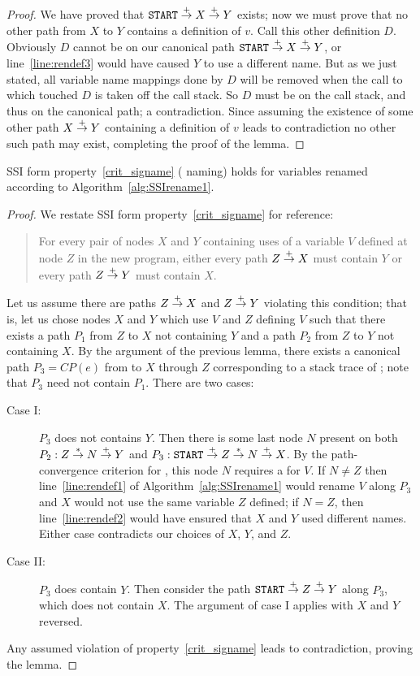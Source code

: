 \begin{proof}
We have proved that $\texttt{START}\stackrel{+}{\rightarrow} X\stackrel{+}{\rightarrow} Y$ exists; now
we must prove that no other path from $X$ to $Y$ contains a definition
of $v$.  Call this other definition $D$.  Obviously $D$ cannot be on
our canonical path $\texttt{START}\stackrel{+}{\rightarrow} X\stackrel{+}{\rightarrow} Y$, or
line~\ref{line:rendef3} would have caused $Y$ to use a different name.
But as we just stated, all variable name mappings done by $D$ will be
removed when the call to  which touched $D$ is taken off
the call stack.  So $D$ must be on the call stack, and thus on the
canonical path; a contradiction. %
%
Since assuming the existence of some other path $X\stackrel{+}{\rightarrow} Y$
containing a definition of $v$ leads to contradiction no other such
path may exist, completing the proof of the lemma.
\end{proof}

\begin{lemma}\label{lem:renamesig}
SSI form property~\ref{crit_signame} (\sigfunction{} naming) holds for
variables renamed according to Algorithm~\ref{alg:SSIrename1}.
\end{lemma}
\begin{proof}
We restate SSI form property~\ref{crit_signame} for reference:
\begin{quote}
For every pair of nodes $X$ and $Y$ containing uses of a
variable $V$ defined at node $Z$ in the new program, either every path
$Z \stackrel{+}{\rightarrow} X$ must contain $Y$ or every path $Z \stackrel{+}{\rightarrow} Y$ must
contain $X$.
\end{quote}
Let us assume there are paths $Z\stackrel{+}{\rightarrow} X$ and $Z\stackrel{+}{\rightarrow} Y$
violating this condition; that is, let us chose nodes $X$ and $Y$
which use $V$ and $Z$ defining $V$ such that there exists a path $P_1$
from $Z$ to $X$ not containing $Y$ and a path $P_2$ from $Z$ to $Y$ not
containing $X$.  By the argument of the previous lemma, there exists
a canonical path $P_3=CP(e)$ from  to $X$ through $Z$
corresponding to a stack
trace of ; note that $P_3$ need not contain $P_1$.
There are two cases:
\begin{description}
\item[Case I:] $P_3$ does not contains $Y$.  Then there is some last
node $N$ present on both $P_2: Z\stackrel{*}{\rightarrow} N\stackrel{+}{\rightarrow} Y$ and
$P_3: \texttt{START}\stackrel{+}{\rightarrow} Z\stackrel{*}{\rightarrow} N\stackrel{+}{\rightarrow} X$.  By 
the path-convergence criterion for ,
this node $N$ requires a \sigfunction{}
for $V$.  If $N\not=Z$ then line~\ref{line:rendef1} of
Algorithm~\ref{alg:SSIrename1} would rename $V$ along $P_3$
and $X$ would not use the same variable $Z$ defined; if
$N=Z$, then line~\ref{line:rendef2} would have ensured that $X$
and $Y$ used different names.  Either case contradicts our choices of
$X$, $Y$, and $Z$.
\item[Case II:] $P_3$ does contain $Y$.  Then consider the path
$\texttt{START}\stackrel{+}{\rightarrow} Z\stackrel{+}{\rightarrow} Y$ along $P_3$, which does not
contain $X$.  The argument of case I applies with $X$ and $Y$ reversed.
\end{description}
Any assumed violation of property~\ref{crit_signame} leads to
contradiction, proving the lemma.
\end{proof}

